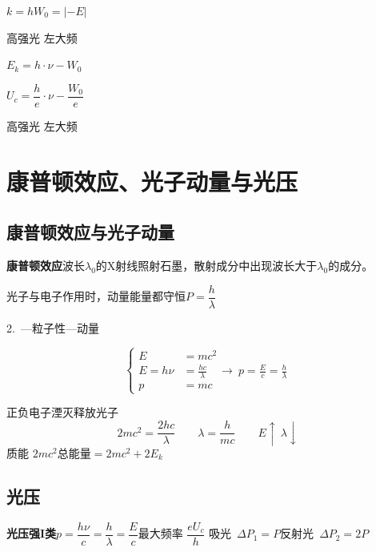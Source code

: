 \noindent $k=h$\qquad $W_0=|-E|$


\noindent 高强光 左大频 %

\noindent $E_k=h\cdot\nu-W_0$ %

\noindent $U_c=\dfrac{h}{e}\cdot\nu-\dfrac{W_0}{e}$ %

\noindent 高强光 左大频 %


\section{康普顿效应、光子动量与光压}
\subsection{康普顿效应与光子动量}
\textbf{康普顿效应}\quad 波长$\lambda_0$的X射线照射石墨，散射成分中出现波长大于$\lambda_0$的成分。

光子与电子作用时，动量能量都守恒\quad $P=\dfrac{h}{\lambda}$

2.\ —粒子性—动量

\[
\left\{\begin{aligned}
E&=mc^2\\
E=h\nu&=\frac{hc}{\lambda}\quad\to\ p=\frac Ec=\frac h\lambda\\
p&=mc
\end{aligned}\right.
\]

正负电子湮灭释放光子
\[
2mc^2=\frac{2hc}{\lambda}\qquad\lambda=\frac{h}{mc}\qquad E\uparrow\ \lambda\downarrow
\]
质能 $2mc^2$\qquad 总能量$=2mc^2+2E_k$

\subsection{光压}
\textbf{光压强I类}\quad $p=\dfrac{h\nu}{c}=\dfrac h\lambda=\dfrac Ec$\qquad 最大频率 $\dfrac{eU_c}{h}$
吸光\ $\Delta P_1=P$\qquad 反射光\ $\Delta P_2=2P$

